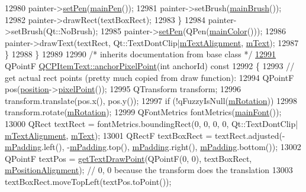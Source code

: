 \begin{DoxyCode}
12980       painter->\hyperlink{a00047_af9c7a4cd1791403901f8c5b82a150195}{setPen}(\hyperlink{a00041_a9ade32d362b22853659201c738269e2a}{mainPen}());
12981       painter->setBrush(\hyperlink{a00041_a10d6585a030633aa79d5ebc5a437f183}{mainBrush}());
12982       painter->drawRect(textBoxRect);
12983     \}
12984     painter->setBrush(Qt::NoBrush);
12985     painter->\hyperlink{a00047_af9c7a4cd1791403901f8c5b82a150195}{setPen}(QPen(\hyperlink{a00041_ad7bf17e4945cc86bbf9a36331da059a0}{mainColor}()));
12986     painter->drawText(textRect, Qt::TextDontClip|\hyperlink{a00041_acdb2e50c38e83da00f083771efbd213f}{mTextAlignment}, 
      \hyperlink{a00041_a2dec3e08c11f51639629374ecec3bd62}{mText});
12987   \}
12988 \}
12989 
12990 \textcolor{comment}{/* inherits documentation from base class */}
\hypertarget{a00115_source_l12991}{}\hyperlink{a00041_ad248f988534a9d07bc7c220a2457142a}{12991} QPointF \hyperlink{a00041_ad248f988534a9d07bc7c220a2457142a}{QCPItemText::anchorPixelPoint}(\textcolor{keywordtype}{int} anchorId)\textcolor{keyword}{ const}
12992 \textcolor{keyword}{}\{
12993   \textcolor{comment}{// get actual rect points (pretty much copied from draw function):}
12994   QPointF pos(\hyperlink{a00041_a0d228a00e819022b5690c65762721129}{position}->\hyperlink{a00038_ae490f9c76ee2ba33752c495d3b6e8fb5}{pixelPoint}());
12995   QTransform transform;
12996   transform.translate(pos.x(), pos.y());
12997   \textcolor{keywordflow}{if} (!qFuzzyIsNull(\hyperlink{a00041_ac37df0061552225d2277e1ee3b48f2cb}{mRotation}))
12998     transform.rotate(\hyperlink{a00041_ac37df0061552225d2277e1ee3b48f2cb}{mRotation});
12999   QFontMetrics fontMetrics(\hyperlink{a00041_a23d391bd6471c45e73f45add67ede902}{mainFont}());
13000   QRect textRect = fontMetrics.boundingRect(0, 0, 0, 0, Qt::TextDontClip|
      \hyperlink{a00041_acdb2e50c38e83da00f083771efbd213f}{mTextAlignment}, \hyperlink{a00041_a2dec3e08c11f51639629374ecec3bd62}{mText});
13001   QRectF textBoxRect = textRect.adjusted(-\hyperlink{a00041_ae7b3ef0ce6046efd4b346d28f2e1fb67}{mPadding}.left(), -\hyperlink{a00041_ae7b3ef0ce6046efd4b346d28f2e1fb67}{mPadding}.top(), 
      \hyperlink{a00041_ae7b3ef0ce6046efd4b346d28f2e1fb67}{mPadding}.right(), \hyperlink{a00041_ae7b3ef0ce6046efd4b346d28f2e1fb67}{mPadding}.bottom());
13002   QPointF textPos = \hyperlink{a00041_aa6e478b1ce198eace89157c4cacc3ddc}{getTextDrawPoint}(QPointF(0, 0), textBoxRect, 
      \hyperlink{a00041_a6c27f7dc1a962a04b32430cf99f04654}{mPositionAlignment}); \textcolor{comment}{// 0, 0 because the transform does the translation}
13003   textBoxRect.moveTopLeft(textPos.toPoint());

\end{DoxyCode}
